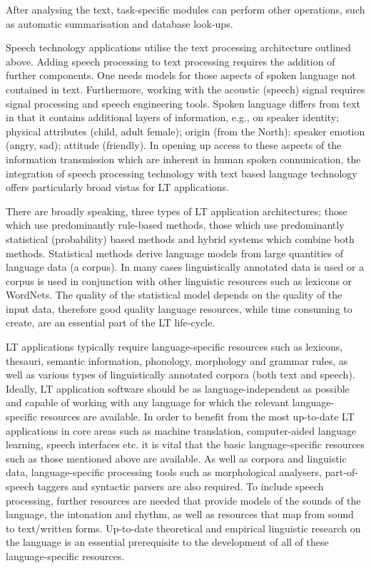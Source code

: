 \begin{multicols}{2}
After analysing the text, task-specific modules can perform other operations, such as automatic summarisation and database look-ups.

Speech technology applications utilise the text processing architecture outlined above. Adding speech processing to text processing requires the addition of further components. One needs models for those aspects of spoken  language not contained in text. Furthermore, working with the acoustic (speech) signal requires signal processing and speech engineering tools. Spoken language differs from text in that it contains additional layers of information, e.g., on speaker identity; physical attributes (child, adult female); origin (from the North); speaker emotion (angry, sad); attitude (friendly). In opening up access to these aspects of the information transmission which are inherent in human spoken connunication, the integration of speech processing technology with text based language technology offers particularly broad vistas for LT applications.

There are broadly speaking, three types of LT application architectures; those which use predominantly rule-based methods, those which use predominantly statistical (probability) based methods and hybrid systems which combine both methods. Statistical methods derive language models from  large quantities of language data (a corpus). In many cases linguistically annotated data is used or a corpus is used in conjunction with other linguistic resources such as lexicons or WordNets. The quality of the statistical model depends on the quality of the input data, therefore good quality language resources, while time consuming to create, are an essential part of the LT life-cycle. 

LT applications typically require language-specific resources such as lexicons, thesauri, semantic information, phonology, morphology and grammar rules, as well as various types of linguistically annotated corpora (both text and speech). Ideally, LT application software should be as language-independent as possible and capable of working with any language for which the relevant language-specific resources are available. In order to benefit from the most up-to-date LT applications in core areas such as machine translation, computer-aided language learning, speech  interfaces etc. it is vital that the basic language-specific resources such as those mentioned above are available. As well as corpora and linguistic data, language-specific processing tools such as morphological analysers, part-of-speech taggers and syntactic parsers  are also required. To include speech processing, further resources are needed that provide models of the sounds of the language, the intonation and rhythm, as well as resources that map from sound to text/written forms. Up-to-date theoretical and empirical linguistic research on the language is an essential prerequisite to the development of all of these language-specific resources.


\end{multicols}
